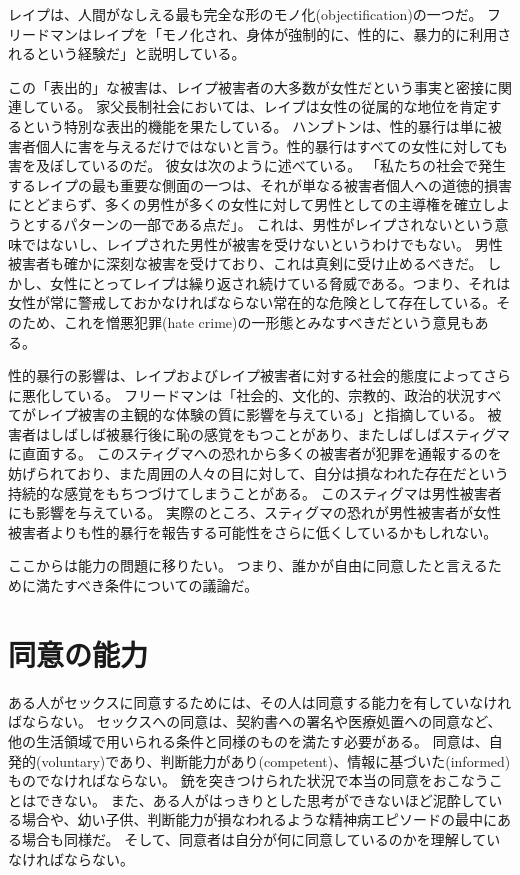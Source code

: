 \documentclass[paper=a4,book,openany]{jlreq}
\newcommand{\ig}[1]{}           %
\begin{document}
レイプは、人間がなしえる最も完全な形のモノ化(objectification)の一つだ。
フリードマン\ig{Karyn L. Freedman}はレイプを「モノ化され、身体が強制的に、性的に、暴力的に利用されるという経験だ」と説明している。

この「表出的」な被害は、レイプ被害者の大多数が女性だという事実と密接に関連している。
家父長制社会においては、レイプは女性の従属的な地位を肯定するという特別な表出的機能を果たしている。
ハンプトンは、性的暴行は単に被害者個人に害を与えるだけではないと言う。性的暴行はすべての女性に対しても害を及ぼしているのだ。
彼女は次のように述べている。
「私たちの社会で発生するレイプの最も重要な側面の一つは、それが単なる被害者個人への道徳的損害にとどまらず、多くの男性が多くの女性に対して男性としての主導権を確立しようとするパターンの一部である点だ」\citep[p.135]{hampton99:_defin_wrong_and_defin_rape}。
これは、男性がレイプされないという意味ではないし、レイプされた男性が被害を受けないというわけでもない。
男性被害者も確かに深刻な被害を受けており、これは真剣に受け止めるべきだ。
しかし、女性にとってレイプは繰り返され続けている脅威である。つまり、それは女性が常に警戒しておかなければならない常在的な危険として存在している。そのため、これを憎悪犯罪(hate crime)の一形態とみなすべきだという意見もある\citep{campo-engelstein16:_rape_hate_crime}。

性的暴行の影響は、レイプおよびレイプ被害者に対する社会的態度によってさらに悪化している。
フリードマンは「社会的、文化的、宗教的、政治的状況すべてがレイプ被害の主観的な体験の質に影響を与えている」と指摘している。
被害者はしばしば被暴行後に恥の感覚をもつことがあり、またしばしばスティグマに直面する。
このスティグマへの恐れから多くの被害者が犯罪を通報するのを妨げられており、また周囲の人々の目に対して、自分は損なわれた存在だという持続的な感覚をもちつづけてしまうことがある。
このスティグマは男性被害者にも影響を与えている。
実際のところ、スティグマの恐れが男性被害者が女性被害者よりも性的暴行を報告する可能性をさらに低くしているかもしれない\citep{mezey87:_male_victim_sexual_assaul}。

ここからは能力の問題に移りたい。
つまり、誰かが自由に同意したと言えるために満たすべき条件についての議論だ。

\section{同意の能力}

ある人がセックスに同意するためには、その人は同意する能力を有していなければならない。
セックスへの同意は、契約書への署名や医療処置への同意など、他の生活領域で用いられる条件と同様のものを満たす必要がある。
同意は、自発的(voluntary)であり、判断能力があり(competent)、情報に基づいた(informed)ものでなければならない。
銃を突きつけられた状況で本当の同意をおこなうことはできない。
また、ある人がはっきりとした思考ができないほど泥酔している場合や、幼い子供、判断能力が損なわれるような精神病エピソードの最中にある場合も同様だ。
そして、同意者は自分が何に同意しているのかを理解していなければならない。
\end{document}
